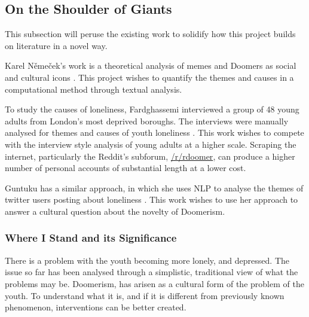 \documentclass[../report.tex]{subfiles}
\begin{document}
\subsection{On the Shoulder of Giants}
This subsection will peruse the existing work to solidify how this project builds on literature in a novel way. 

Karel Němeček's work is a theoretical analysis of memes and Doomers as social and cultural icons \cite{memes_reservoir}.
This project wishes to quantify the themes and causes in a computational method through textual analysis.

To study the causes of loneliness, Fardghassemi interviewed a group of 48 young adults from London's most deprived boroughs. The interviews were manually analysed for themes and causes of youth loneliness \cite{fardghassemi_interviews}.
This work wishes to compete with the interview style analysis of young adults at a higher scale.
Scraping the internet, particularly the Reddit's subforum,
\href{www.reddit.com/r/doomer}{/r/rdoomer},
can produce a higher number of personal accounts of substantial length at a lower cost.

Guntuku has a similar approach, in which she uses NLP to analyse the themes of twitter users posting about loneliness \cite{twitter_loneliness}.
This work wishes to use her approach to answer a cultural question about the novelty of Doomerism.

\subsubsection{Where I Stand and its Significance}
There is a problem with the youth becoming more lonely, and depressed. 
The issue so far has been analysed through a simplistic, traditional view of what the problems may be.
Doomerism, has arisen as a cultural form of the problem of the youth. 
To understand what it is, and if it is different from previously known phenomenon, interventions can be better created. 
\end{document}

